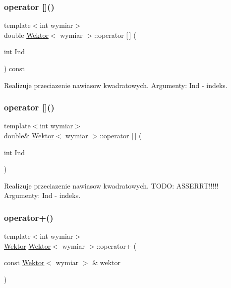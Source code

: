 \subsubsection{\texorpdfstring{operator []()}{operator []()}\hspace{0.1cm}{\footnotesize\ttfamily [1/2]}}
{\footnotesize\ttfamily template$<$int wymiar$>$ \\
double \mbox{\hyperlink{class_wektor}{Wektor}}$<$ wymiar $>$\+::operator \mbox{[}$\,$\mbox{]} (\begin{DoxyParamCaption}\item[{int}]{Ind }\end{DoxyParamCaption}) const\hspace{0.3cm}{\ttfamily [inline]}}

Realizuje przeciazenie nawiasow kwadratowych. Argumenty\+: Ind -\/ indeks. \mbox{\label{class_wektor_aa37426fea8cdf38b5e38666ae10e6f76}} 
\subsubsection{\texorpdfstring{operator []()}{operator []()}\hspace{0.1cm}{\footnotesize\ttfamily [2/2]}}
{\footnotesize\ttfamily template$<$int wymiar$>$ \\
double\& \mbox{\hyperlink{class_wektor}{Wektor}}$<$ wymiar $>$\+::operator \mbox{[}$\,$\mbox{]} (\begin{DoxyParamCaption}\item[{int}]{Ind }\end{DoxyParamCaption})\hspace{0.3cm}{\ttfamily [inline]}}

Realizuje przeciazenie nawiasow kwadratowych. T\+O\+DO\+: A\+S\+S\+E\+R\+R\+T!!!!! Argumenty\+: Ind -\/ indeks. \mbox{\label{class_wektor_a397fe70aad2b950bbf1509907bf21477}} 
\subsubsection{\texorpdfstring{operator+()}{operator+()}}
{\footnotesize\ttfamily template$<$int wymiar$>$ \\
\mbox{\hyperlink{class_wektor}{Wektor}} \mbox{\hyperlink{class_wektor}{Wektor}}$<$ wymiar $>$\+::operator+ (\begin{DoxyParamCaption}\item[{const \mbox{\hyperlink{class_wektor}{Wektor}}$<$ wymiar $>$ \&}]{wektor }\end{DoxyParamCaption})\hspace{0.3cm}{\ttfamily [inline]}}

